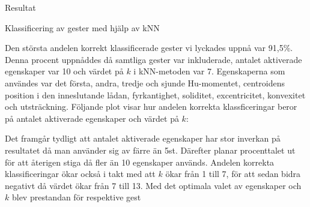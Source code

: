 \documentclass[../rapport_MVEX01-11-05]{subfiles}
\begin{document}
Resultat

Klassificering av gester med hjälp av kNN

Den största andelen korrekt klassificerade gester vi lyckades uppnå
var 91,5\%. Denna procent uppnåddes då samtliga gester var
inkluderade, antalet aktiverade egenskaper var 10 och värdet på $k$
i kNN-metoden var 7. Egenskaperna som användes var det första,
andra, tredje och sjunde Hu-momentet, centroidens position i den
inneslutande lådan, fyrkantighet, soliditet, excentricitet,
konvexitet och utsträckning. Följande plot visar hur andelen
korrekta klassficeringar beror på antalet aktiverade egenskaper och
värdet på $k$:


Det framgår tydligt att antalet aktiverade egenskaper har stor
inverkan på resultatet då man använder sig av färre än
5st. Därefter planar procenttalet ut för att återigen stiga då
fler än 10 egenskaper används. Andelen korrekta klassificeringar
ökar också i takt med att $k$ ökar från 1 till 7, för att sedan
bidra negativt då värdet ökar från 7 till 13. Med det optimala
valet av egenskaper och $k$ blev prestandan för respektive gest




\subsection{\knn}
\end{document}
